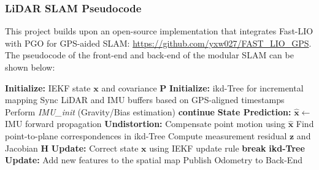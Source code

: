 \documentclass[12pt, a4paper]{article}
\begin{document}
\subsubsection*{LiDAR SLAM Pseudocode}
This project builds upon an open-source implementation
that integrates Fast-LIO with PGO for GPS-aided SLAM:
\url{https://github.com/yxw027/FAST_LIO_GPS}. The pseudocode of the front-end and back-end of the modular SLAM can be shown below:
{
    \singlespacing
    \begin{algorithm}[H]
    \caption{Front-End: FAST-LIO with MAVLink TimeSync}
    \begin{algorithmic}[1]
    \State \textbf{Initialize:} IEKF state $\mathbf{x}$ and covariance $\mathbf{P}$
    \State \textbf{Initialize:} ikd-Tree for incremental mapping
        \State Sync LiDAR and IMU buffers based on GPS-aligned timestamps
            \State Perform \textit{IMU\_init} (Gravity/Bias estimation)
            \State \textbf{continue}
        \EndIf
        \State \textbf{State Prediction:} $\hat{\mathbf{x}} \leftarrow$ IMU forward propagation
        \State \textbf{Undistortion:} Compensate point motion using $\hat{\mathbf{x}}$
            \State Find point-to-plane correspondences in ikd-Tree
            \State Compute measurement residual $\mathbf{z}$ and Jacobian $\mathbf{H}$
            \State \textbf{Update:} Correct state $\mathbf{x}$ using IEKF update rule
             \State \textbf{break} \EndIf
        \EndFor
        \State \textbf{ikd-Tree Update:} Add new features to the spatial map
        \State Publish Odometry to Back-End
    \EndWhile
    \end{algorithmic}
    \end{algorithm}
}
\end{document}
